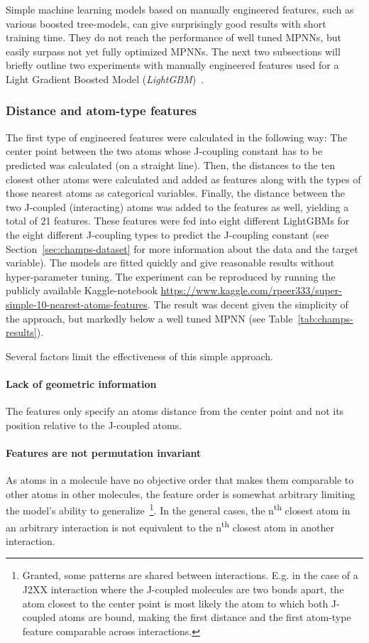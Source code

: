 Simple machine learning models based on manually engineered features, such as various boosted tree-models, can give surprisingly good results with short training time. They do not reach the performance of well tuned MPNNs, but easily surpass not yet fully optimized MPNNs. The next two subsections will briefly outline two experiments with manually engineered features used for a Light Gradient Boosted Model (\textit{LightGBM})~\cite{Ke2017}.


\subsubsection{Distance and atom-type features}
\label{sec:dist-atom-type}

The first type of engineered features were calculated in the following way: The center point between the two atoms whose J-coupling constant has to be predicted was calculated (on a straight line). Then, the distances to the ten closest other atoms were calculated and added as features along with the types of those nearest atoms as categorical variables. Finally, the distance between the two J-coupled (interacting) atoms was added to the features as well, yielding a total of 21 features. These features were fed into eight different LightGBMs
for the eight different J-coupling types to predict the J-coupling constant (see Section~\ref{sec:champs-dataset} for more information about the data and the target variable). The models are fitted quickly and give reasonable results without hyper-parameter tuning. The experiment can be reproduced by running the publicly available Kaggle-notebook \url{https://www.kaggle.com/rpeer333/super-simple-10-nearest-atoms-features}. The result was decent given the simplicity of the approach, but markedly below a well tuned MPNN (see Table~\ref{tab:champs-results}).

\noindent Several factors limit the effectiveness of this simple approach.

\paragraph*{Lack of geometric information} The features only specify an atoms distance from the center point and not its position relative to the J-coupled atoms.

\paragraph*{Features are not permutation invariant} As atoms in a molecule have no objective order that makes them comparable to other atoms in other molecules, the feature order is somewhat arbitrary limiting the model's ability to generalize~\footnote{
	Granted, some patterns are shared between interactions. E.g. in the case of a J2XX interaction where the J-coupled molecules are two bonds apart, the atom closest to the center point is most likely the atom to which both J-coupled atoms are bound, making the first distance and the first atom-type feature comparable across interactions.
}. In the general cases, the n\textsuperscript{th} closest atom in an arbitrary interaction is not equivalent to the n\textsuperscript{th} closest atom in another interaction.

